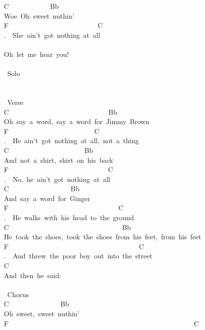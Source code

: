 {C\ \ \ \ \ \ \ \ \ \ \ \ Bb\\
Woe\ Oh\ sweet\ nuthin'\\
F\ \ \ \ \ \ \ \ \ \ \ \ \ \ \ \ \ \ \ \ \ \ \ \ \ \ C\\
.\ \ She\ ain't\ got\ nothing\ at\ all\\
\\
Oh\ let\ me\ hear\ you!\\
\\
\lbrack\ Solo\rbrack\\
\\
\\
\lbrack\ Verse\rbrack\\
C\ \ \ \ \ \ \ \ \ \ \ \ \ \ \ \ \ \ \ \ \ \ \ \ \ \ \ \ \ Bb\\
Oh\ say\ a\ word,\ say\ a\ word\ for\ Jimmy\ Brown\\
F\ \ \ \ \ \ \ \ \ \ \ \ \ \ \ \ \ \ \ \ \ \ \ \ \ C\\
.\ \ He\ ain't\ got\ nothing\ at\ all,\ not\ a\ thing\\
C\ \ \ \ \ \ \ \ \ \ \ \ \ \ \ \ \ \ \ \ \ \ Bb\\
And\ not\ a\ shirt,\ shirt\ on\ his\ back\\
F\ \ \ \ \ \ \ \ \ \ \ \ \ \ \ \ \ \ \ \ \ \ \ \ \ \ \ \ \ C\\
.\ \ No,\ he\ ain't\ got\ nothing\ at\ all\\
C\ \ \ \ \ \ \ \ \ \ \ \ \ \ \ \ \ \ Bb\\
And\ say\ a\ word\ for\ Ginger\\
F\ \ \ \ \ \ \ \ \ \ \ \ \ \ \ \ \ \ \ \ \ \ \ \ \ \ \ \ \ \ \ \ C\\
.\ \ He\ walks\ with\ his\ head\ to\ the\ ground\\
C\ \ \ \ \ \ \ \ \ \ \ \ \ \ \ \ \ \ \ \ \ \ \ \ \ \ \ \ \ \ \ \ \ Bb\\
He\ took\ the\ shoes,\ took\ the\ shoes\ from\ his\ feet,\ from\ his\ feet\\
F\ \ \ \ \ \ \ \ \ \ \ \ \ \ \ \ \ \ \ \ \ \ \ \ \ \ \ \ \ \ \ \ \ \ \ \ \ \ C\\
.\ \ And\ threw\ the\ poor\ boy\ out\ into\ the\ street\\
C\\
And\ then\ he\ said:\\
\\
\lbrack\ Chorus\rbrack\\
C\ \ \ \ \ \ \ \ \ \ \ \ \ \ \ Bb\\
Oh\ sweet,\ sweet\ nuthin'\\
F\ \ \ \ \ \ \ \ \ \ \ \ \ \ \ \ \ \ \ \ \ \ \ \ \ \ \ \ \ \ \ \ \ \ \ \ \ \ \ \ \ \ \ \ \ \ \ \ \ \ \ \ \ \ C\\
}
